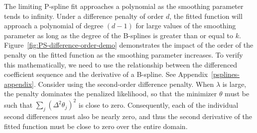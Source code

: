 The limiting P-spline fit approaches a polynomial as the smoothing parameter tends to infinity. Under a difference penalty of order $d$, the fitted function will approach a polynomial of degree $\left(d-1\right)$ for large values of the smoothing parameter as long as the degree of the B-splines is greater than or equal to $k$. Figure~\ref{fig:PS-difference-order-demo} demonstrates the impact of the order of the penalty on the fitted function as the smoothing parameter increases. To verify this mathematically, we need to use the relationship between the differenced coefficient sequence and the derivative of a B-spline. See Appendix~\ref{psplines-appendix}. Consider using the second-order difference penalty. When $\lambda$ is large, the penalty dominates the penalized likelihood, so that the minimizer $\theta$ must be such that $\sum\limits_{j}\left(\Delta^2\theta_j\right)^2$ is close to zero. Consequently, each of the individual second differences must also be nearly zero, and thus the second derivative of the fitted function must be close to zero over the entire domain.

